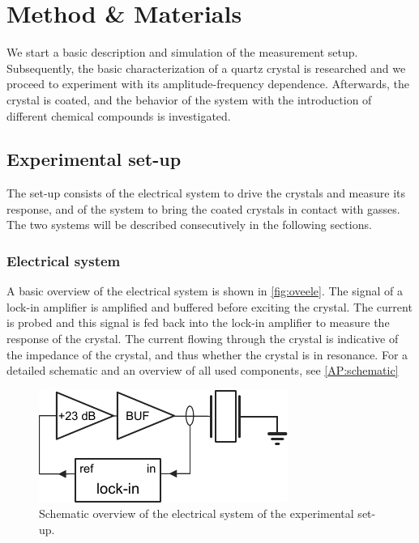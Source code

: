 \clearpage\section{Method \& Materials}
We start a basic description and simulation of the measurement setup. Subsequently, the basic characterization of a quartz crystal is researched and we proceed to experiment with its amplitude-frequency dependence. Afterwards, the crystal is coated, and the behavior of the system with the introduction of different chemical compounds is investigated. 

\subsection{Experimental set-up}
The set-up consists of the electrical system to drive the crystals and measure its response, and of the system to bring the coated crystals in contact with gasses. The two systems will be described consecutively in the following sections.

\subsubsection{Electrical system}
A basic overview of the electrical system is shown in \autoref{fig:oveele}. The signal of a lock-in amplifier is amplified and buffered before exciting the crystal. The current is probed and this signal is fed back into the lock-in amplifier to measure the response of the crystal. The current flowing through the crystal is indicative of the impedance of the crystal, and thus whether the crystal is in resonance. For a detailed schematic and an overview of all used components, see \autoref{AP:schematic}

\begin{figure}
	\centering
		\includegraphics[width=\textwidth]{figures/oveele.pdf}
	\caption{Schematic overview of the electrical system of the experimental set-up. }
	\label{fig:oveele}
\end{figure}


